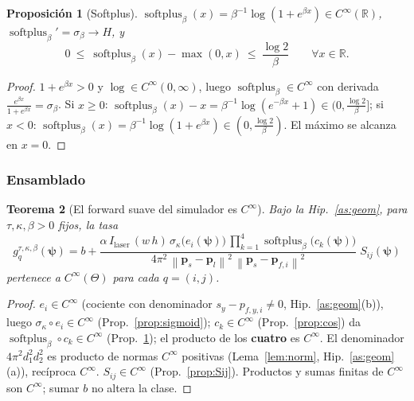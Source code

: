 \documentclass[11pt,a4paper]{article}
\theoremstyle{plain}
\newtheorem{theorem}{Teorema}
\newtheorem{proposition}[theorem]{Proposici\'on}
\theoremstyle{definition}
\newcommand{\vect}[1]{\boldsymbol{#1}}
\newcommand{\R}{\mathbb{R}}
\newcommand{\softplus}{\operatorname{softplus}}
\newcommand{\norm}[1]{\left\lVert #1 \right\rVert}
\begin{document}
\begin{proposition}[Softplus]\label{prop:softplus}
$\softplus_\beta(x)=\beta^{-1}\log(1+e^{\beta x})\in C^\infty(\R)$,
$\softplus_\beta'=\sigma_\beta\to H$, y
\begin{equation}
    0\ \le\ \softplus_\beta(x)-\max(0,x)\ \le\ \frac{\log 2}{\beta}
    \qquad\forall x\in\R.
    \label{eq:sp-bound}
\end{equation}
\end{proposition}
\begin{proof}
$1+e^{\beta x}>0$ y $\log\in C^\infty(0,\infty)$, luego $\softplus_\beta\in
C^\infty$ con derivada $\frac{e^{\beta x}}{1+e^{\beta x}}=\sigma_\beta$. Si
$x\ge0$: $\softplus_\beta(x)-x=\beta^{-1}\log(e^{-\beta x}+1)\in(0,\frac{\log2}{\beta}]$;
si $x<0$: $\softplus_\beta(x)=\beta^{-1}\log(1+e^{\beta x})\in(0,\frac{\log2}{\beta})$.
El m\'aximo se alcanza en $x=0$.
\end{proof}

\subsubsection*{Ensamblado}

\begin{theorem}[El forward suave del simulador es $C^\infty$]\label{thm:g-smooth}
Bajo la Hip.~\ref{as:geom}, para $\tau,\kappa,\beta>0$ fijos, la tasa
\begin{equation}
    g^{\tau,\kappa,\beta}_q(\vect{\psi})
    =b+\frac{\alpha\,I_{\mathrm{laser}}\,(w\,h)\,
        \sigma_\kappa\!\bigl(e_i(\vect{\psi})\bigr)\,
        \prod_{k=1}^{4}\softplus_\beta\!\bigl(c_k(\vect{\psi})\bigr)}
        {4\pi^2\,
         \norm{\vect{p}_s-\vect{p}_l}^2\,\norm{\vect{p}_s-\vect{p}_{f,i}}^2}\;
    S_{ij}(\vect{\psi})
    \label{eq:g-smooth-def}
\end{equation}
pertenece a $C^\infty(\Theta)$ para cada $q=(i,j)$.
\end{theorem}
\begin{proof}
$e_i\in C^\infty$ (cociente con denominador $s_y-p_{f,y,i}\neq0$,
Hip.~\ref{as:geom}(b)), luego $\sigma_\kappa\circ e_i\in C^\infty$
(Prop.~\ref{prop:sigmoid}); $c_k\in C^\infty$ (Prop.~\ref{prop:cos}) da
$\softplus_\beta\circ c_k\in C^\infty$ (Prop.~\ref{prop:softplus}); el producto de
los \textbf{cuatro} es $C^\infty$. El denominador $4\pi^2 d_1^2 d_2^2$ es producto
de normas $C^\infty$ positivas (Lema~\ref{lem:norm}, Hip.~\ref{as:geom}(a)),
rec\'iproca $C^\infty$. $S_{ij}\in C^\infty$ (Prop.~\ref{prop:Sij}). Productos y
sumas finitas de $C^\infty$ son $C^\infty$; sumar $b$ no altera la clase.
\end{proof}
\end{document}
